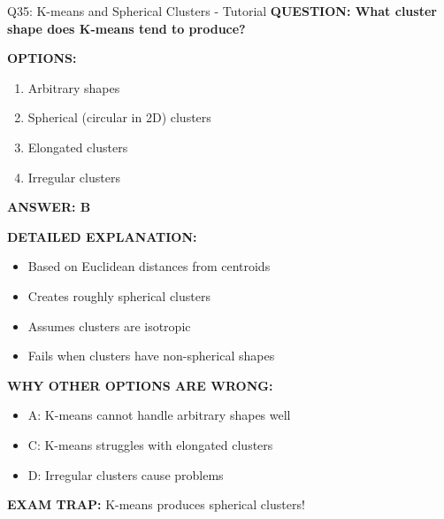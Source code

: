 \documentclass[8pt]{beamer}
\begin{document}
	\begin{frame}{Q35: K-means and Spherical Clusters - Tutorial}
		\fontsize{6.5}{7.5}\selectfont
		\textbf{QUESTION: What cluster shape does K-means tend to produce?}
		
		\vspace{0.1cm}
		\textbf{OPTIONS:}
		\begin{enumerate}
			\item Arbitrary shapes
			\item Spherical (circular in 2D) clusters
			\item Elongated clusters
			\item Irregular clusters
		\end{enumerate}
		
		\vspace{0.1cm}
		\textcolor{myblue}{\textbf{ANSWER: B}}
		
		\vspace{0.1cm}
		\textbf{DETAILED EXPLANATION:}
		\begin{itemize}
			\item Based on Euclidean distances from centroids
			\item Creates roughly spherical clusters
			\item Assumes clusters are isotropic
			\item Fails when clusters have non-spherical shapes
		\end{itemize}
		
		\vspace{0.1cm}
		\textcolor{myred}{\textbf{WHY OTHER OPTIONS ARE WRONG:}}
		\begin{itemize}
			\item \textcolor{myred}{A:} K-means cannot handle arbitrary shapes well
			\item \textcolor{myred}{C:} K-means struggles with elongated clusters
			\item \textcolor{myred}{D:} Irregular clusters cause problems
		\end{itemize}
		
		\textcolor{myred}{\textbf{EXAM TRAP:}} K-means produces \textcolor{myblue}{spherical clusters}!
	\end{frame}
	
	
\end{document}

